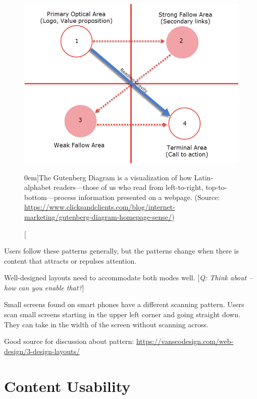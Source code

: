 \begin{figure}%
  \includegraphics[width=1.0\textwidth]{../figures/gutenberg-diagram.jpg}
  \caption[][0em]{The Gutenberg Diagram is a visualization of how Latin-alphabet readers---those of us who read from left-to-right, top-to-bottom---process information presented on a webpage. (Source: \url{https://www.clicksandclients.com/blog/internet-marketing/gutenberg-diagram-homepage-sense/})}
  \label{fig:gutenberg-diagram}
\end{figure}

Users follow these patterns generally, but the patterns change when there is content that attracts or repulses attention.

Well-designed layouts need to accommodate both modes well. [\emph{Q: Think about -- how can you enable that?}]

Small screens found on smart phones have a different scanning pattern. Users scan small screens starting in the upper left corner and going straight down. They can take in the width of the screen without scanning across.





Good source for discussion about pattern: \url{https://vanseodesign.com/web-design/3-design-layouts/}







\section{Content Usability} %
\label{sec:content_usability}

